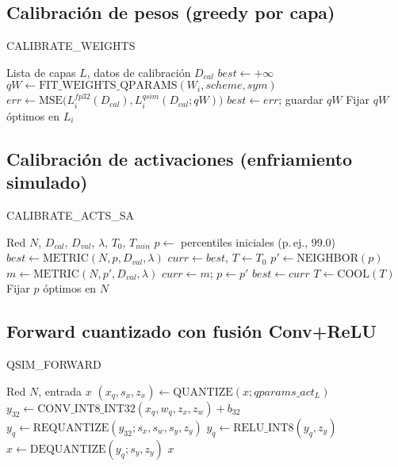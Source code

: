 \subsection*{Calibración de pesos (greedy por capa)}
\begin{algorithm}[H]
\caption{CALIBRATE\_WEIGHTS}
\begin{algorithmic}[1]
\Require Lista de capas $L$, datos de calibración $D_{cal}$
    \State $best \gets +\infty$
            \State $qW \gets \text{FIT\_WEIGHTS\_QPARAMS}(W_i, scheme, sym)$
            \State $err \gets \text{MSE}\big(L_i^{fp32}(D_{cal}), L_i^{qsim}(D_{cal}; qW)\big)$
             \State $best \gets err$; guardar $qW$ \EndIf
        \EndFor
    \EndFor
    \State Fijar $qW$ óptimos en $L_i$
\EndFor
\end{algorithmic}
\end{algorithm}

\subsection*{Calibración de activaciones (enfriamiento simulado)}
\begin{algorithm}[H]
\caption{CALIBRATE\_ACTS\_SA}
\begin{algorithmic}[1]
\Require Red $N$, $D_{cal}$, $D_{val}$, $\lambda$, $T_0$, $T_{min}$
\State $p \gets$ percentiles iniciales (p.\,ej., 99.0)
\State $best \gets \text{METRIC}(N,p,D_{val},\lambda)$
\State $curr \gets best$, $T \gets T_0$
    \State $p' \gets \text{NEIGHBOR}(p)$ 
    \State $m \gets \text{METRIC}(N,p',D_{val},\lambda)$
     $curr \gets m$; $p \gets p'$ \EndIf
     $best \gets curr$ \EndIf
    \State $T \gets \text{COOL}(T)$
\EndWhile
\State Fijar $p$ óptimos en $N$
\end{algorithmic}
\end{algorithm}

\subsection*{Forward cuantizado con fusión Conv+ReLU}
\begin{algorithm}[H]
\caption{QSIM\_FORWARD}
\begin{algorithmic}[1]
\Require Red $N$, entrada $x$
    \State $(x_q,s_x,z_x) \gets \text{QUANTIZE}(x; qparams\_act_L)$
    \State $y_{32} \gets \text{CONV\_INT8\_INT32}(x_q, w_q, z_x, z_w) + b_{32}$
    \State $y_q \gets \text{REQUANTIZE}(y_{32}; s_x, s_w, s_y, z_y)$
     $y_q \gets \text{RELU\_INT8}(y_q, z_y)$ \EndIf
    \State $x \gets \text{DEQUANTIZE}(y_q; s_y, z_y)$
\EndFor
\State \Return $x$
\end{algorithmic}
\end{algorithm}
